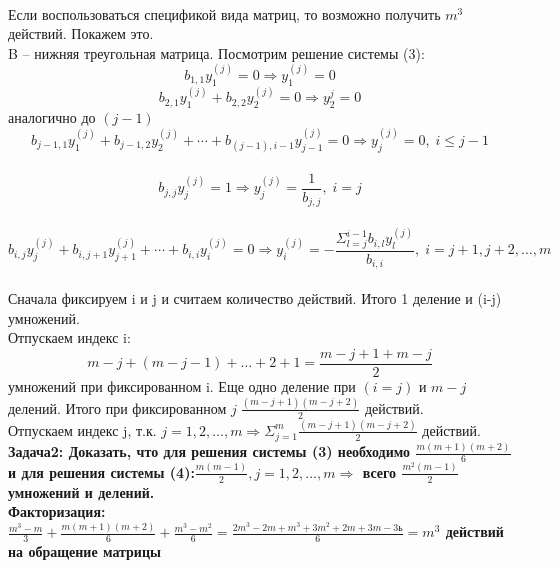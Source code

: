 \documentclass[oneside, final, 14pt]{extreport}
\begin{document}
\\
Если воспользоваться спецификой вида матриц, то возможно получить \(m^3\) действий. Покажем это.
\\
B -- нижняя треугольная матрица. Посмотрим решение системы (3):
\[b_{1,1}y_1^{(j)}=0 \Rightarrow y_1^{(j)}=0\]
\[b_{2,1}y_1^{(j)}+b_{2,2}y_2^{(j)}=0 \Rightarrow y_2^{j}=0\]
аналогично до \((j-1)\)
\[b_{j-1,1}y_{1}^{(j)}+b_{j-1,2}y_2^{(j)}+\cdots+b_{(j-1), i-1}y_{j-1}^{(j)}=0 \Rightarrow y_{j}^{(j)}=0,\; i\leq j-1\]
\\
\[b_{j,j}y_{j}^{(j)}=1 \Rightarrow y_j^{(j)}=\frac{1}{b_{j,j}}, \; i=j\]
\\
\[b_{i,j}y_{j}^{(j)}+b_{i,j+1}y_{j+1}^{(j)}+\cdots+b_{i,i}y_{i}^{(j)}=0 \Rightarrow
y_{i}^{(j)}=-\frac{\Sigma_{l=j}^{i-1}b_{i,l}y_{l}^{(j)}}{b_{i,i}}, \; i=j+1, j+2, \ldots, m \]
\\
Сначала фиксируем i и j и считаем количество действий. Итого 1 деление и (i-j) умножений.
\\
Отпускаем индекс i:
\[ m-j+(m-j-1)+\ldots+2+1 = \frac{m-j+1+m-j}{2} \]
умножений при фиксированном i. Еще одно деление при \((i=j)\) и \( m-j\) делений.
Итого при фиксированном   \( j \; \frac{(m-j+1)(m-j+2)}{2} \)  действий.
\\
Отпускаем индекс j, т.к. \( j=1, 2, \ldots, m \Rightarrow \Sigma_{j=1}^m \frac{(m-j+1)(m-j+2)}{2} \) действий.
\\
\bfseries Задача2: \normalfont  Доказать, что для решения системы (3) необходимо \(\frac{m(m+1)(m+2)}{6} \) и для решения системы (4):\(\frac{m(m-1)}{2}, j=1, 2,\ldots ,m \Rightarrow\) всего \(\frac{m^2(m-1)}{2}\) умножений и делений.
\\
Факторизация:  \(\frac{m^3-m}{3}+\frac{m(m+1)(m+2)}{6}+\frac{m^3-m^2}{6}=\frac{2m^3-2m+m^3+3m^2+2m+3m-3ь}{6}=m^3 \) действий на обращение матрицы
\end{document}
